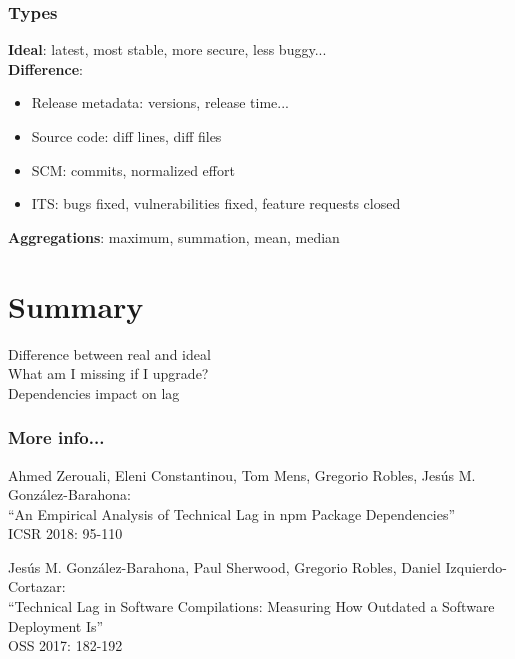 \documentclass[17pt,aspectratio=169,hyperref=pdfusetitle]{beamer}
\begin{document}
\begin{frame}[fragile]
  \frametitle{Types}

  {\small
  \textbf{Ideal}: latest, most stable, more secure, less buggy... \\

  \textbf{Difference}: \\
  \begin{itemize}
  \item Release metadata: versions, release time...
  \item Source code: diff lines, diff files
  \item SCM: commits, normalized effort
  \item ITS: bugs fixed, vulnerabilities fixed, feature requests closed
  \end{itemize}

  \textbf{Aggregations}: maximum, summation, mean, median \\
  }
\end{frame}

\section{Summary}

\begin{frame}[fragile]

  {\Large
    Difference between real and ideal \\
    \vspace{.5cm}
    What am I missing if I upgrade? \\
    \vspace{.5cm}
    Dependencies impact on lag \\
  }
\end{frame}

\begin{frame}[fragile]
  \frametitle{More info...}

{\small
  Ahmed Zerouali, Eleni Constantinou, Tom Mens, Gregorio Robles, Jesús M. González-Barahona: \\
  ``An Empirical Analysis of Technical Lag in npm Package Dependencies'' \\
  ICSR 2018: 95-110 \\

  \vspace{.5cm}
  
  Jesús M. González-Barahona, Paul Sherwood, Gregorio Robles, Daniel Izquierdo-Cortazar: \\
  ``Technical Lag in Software Compilations: Measuring How Outdated a Software Deployment Is'' \\
  OSS 2017: 182-192 \\
}  
\end{frame}
\end{document}
